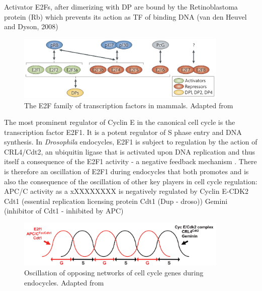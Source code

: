 \documentclass[11pt,twoside,a4paper]{report}
\begin{document}
				Activator E2Fs, after dimerizing with DP are bound by the Retinoblastoma protein (Rb) which prevents its action as TF of binding DNA 
				 (van den Heuvel and Dyson, 2008)
			
				\begin{figure}[here]
					\centering
					\includegraphics[width=0.9\textwidth]{pngs/E2F_family.png}
					\caption[The E2F family of transcription factors in mammals]
					{The E2F family of transcription factors in mammals. {\footnotesize Adapted from \cite{VandenHeuvel2008}}}
					\label{fig:E2F_family}
				\end{figure}
				
				The most prominent regulator of Cyclin E in the canonical cell cycle is the transcription factor E2F1. It is a potent regulator of S phase entry and DNA synthesis.
				In \textit{Drosophila} endocycles, E2F1 is subject to regulation by the action of CRL4/Cdt2, an ubiquitin ligase that is activated upon DNA replication and thus itself a consequence of the E2F1 activity - a negative feedback mechanism \cite{Zielke2011}\cite{Havens2011}\cite{Shibutani2008}.  There is therefore an oscillation of E2F1 during endocycles that both promotes and is also the consequence of the oscillation of other key players in cell cycle regulation: 
				APC/C activity as a xXXXXXXXX is negatively regulated by Cyclin E-CDK2
				Cdt1 (essential replication licensing protein Cdt1 (Dup - droso))
				Gemini (inhibitor of Cdt1 - inhibited by APC)
				
				\begin{figure}[here]
					\centering
					\includegraphics[width=0.9\textwidth]{pngs/oscilation.png}
					\caption[Oscillation of opposing networks of cell cycle genes during endocycles]
					{Oscillation of opposing networks of cell cycle genes during endocycles. {\footnotesize Adapted from \cite{Fox2013}}}
					\label{fig:oscillation}
				\end{figure}
				
\end{document}
